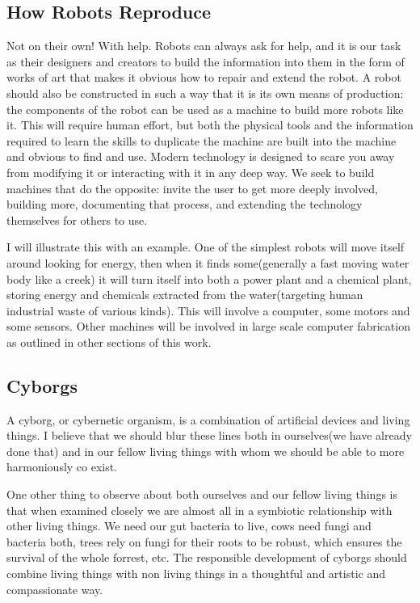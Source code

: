 \subsection{How Robots Reproduce}\label{how-robots-reproduce}

Not on their own! With help. Robots can always ask for help, and it is
our task as their designers and creators to build the information into
them in the form of works of art that makes it obvious how to repair and
extend the robot. A robot should also be constructed in such a way that
it is its own means of production: the components of the robot can be
used as a machine to build more robots like it. This will require human
effort, but both the physical tools and the information required to
learn the skills to duplicate the machine are built into the machine and
obvious to find and use. Modern technology is designed to scare you away
from modifying it or interacting with it in any deep way. We seek to
build machines that do the opposite: invite the user to get more deeply
involved, building more, documenting that process, and extending the
technology themselves for others to use.

I will illustrate this with an example. One of the simplest robots will
move itself around looking for energy, then when it finds some(generally
a fast moving water body like a creek) it will turn itself into both a
power plant and a chemical plant, storing energy and chemicals extracted
from the water(targeting human industrial waste of various kinds). This
will involve a computer, some motors and some sensors. Other machines
will be involved in large scale computer fabrication as outlined in
other sections of this work.

\subsection{Cyborgs}\label{cyborgs}

A cyborg, or cybernetic organism, is a combination of artificial devices
and living things. I believe that we should blur these lines both in
ourselves(we have already done that) and in our fellow living things
with whom we should be able to more harmoniously co exist.

One other thing to observe about both ourselves and our fellow living
things is that when examined closely we are almost all in a symbiotic
relationship with other living things. We need our gut bacteria to live,
cows need fungi and bacteria both, trees rely on fungi for their roots
to be robust, which ensures the survival of the whole forrest, etc. The
responsible development of cyborgs should combine living things with non
living things in a thoughtful and artistic and compassionate way.

